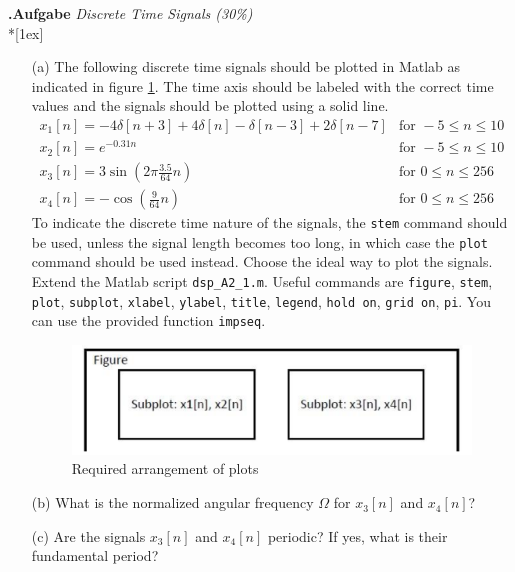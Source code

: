 \documentclass[12pt,a4paper,austrian]{article}
\newcounter{theaufgabe}\setcounter{theaufgabe}{1}
\newenvironment{aufgabe}[1]%
  {\bigskip\par\noindent\begin{nopagebreak}
   \textsf{\textbf{\arabic{theaufgabe}.\thinspace Aufgabe}}\quad
      \textsf{\textit{#1}}\\*[1ex]%
\stepcounter{theaufgabe}\hspace{2ex}\end{nopagebreak}}
  {\par\pagebreak[2]}
\begin{document}
\begin{aufgabe}{Discrete Time Signals (30\%)}

\begin{enumerate}

\item[(a)]
The following discrete time signals should be plotted in Matlab as indicated in figure \ref{fig:ex1_required_plot_layout}.
The time axis should be labeled with the correct time values and the signals should be plotted using a solid line.
\[
\begin{array}{ll}
x_{1}[n] = -4 \delta[n+3] + 4 \delta[n] - \delta[n-3] + 2 \delta[n-7] & \text{for } -5 \leq n \leq 10 \\
x_{2}[n] = e^{-0.31 n} & \text{for } -5 \leq n \leq 10 \\
x_{3}[n] = 3 \sin \left(2 \pi \frac{3.5}{64} n\right) & \text{for } 0 \leq n \leq 256 \\
x_{4}[n] = -\cos \left(\frac{9}{64} n\right) & \text{for } 0 \leq n \leq 256
\end{array}
\]
To indicate the discrete time nature of the signals, the \texttt{stem} command should be used, unless the signal length becomes too long, in which case the \texttt{plot} command should be used instead.
Choose the ideal way to plot the signals.
Extend the Matlab script \texttt{dsp\_A2\_1.m}.
Useful commands are \texttt{figure}, \texttt{stem}, \texttt{plot}, \texttt{subplot}, \texttt{xlabel}, \texttt{ylabel}, \texttt{title}, \texttt{legend}, \texttt{hold on}, \texttt{grid on}, \texttt{pi}.
You can use the provided function \texttt{impseq}.

\begin{figure}[h]
\centering
\includegraphics[width=\textwidth]{fig/ex1_required_plot_layout}
\caption{Required arrangement of plots}
\label{fig:ex1_required_plot_layout}
\end{figure}

\item[(b)]
What is the normalized angular frequency $\Omega$ for $x_{3}[n]$ and $x_{4}[n]$?

\item[(c)]
Are the signals $x_{3}[n]$ and $x_{4}[n]$ periodic? If yes, what is their fundamental period?


\end{enumerate}
\end{aufgabe}
\end{document}
